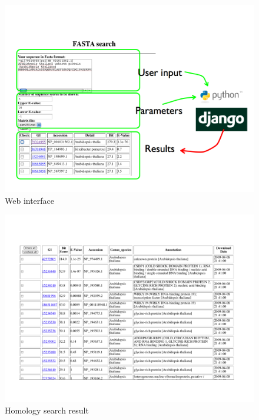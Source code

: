 \documentclass[11pt,letterpaper,twoside,english]{article}
\begin{document}
%
\begin{figure}[h]
\begin{centering}
\includegraphics[width=1\linewidth]{figures/web_interface}
\par\end{centering}

\caption{\label{fig:Web-interface}Web interface}

\end{figure}


%
\begin{figure}[h]
\begin{centering}
\includegraphics[width=1\linewidth]{figures/Result_selection}
\par\end{centering}

\caption{\label{fig:Homology-search-result}Homology search result}

\end{figure}
\end{document}
